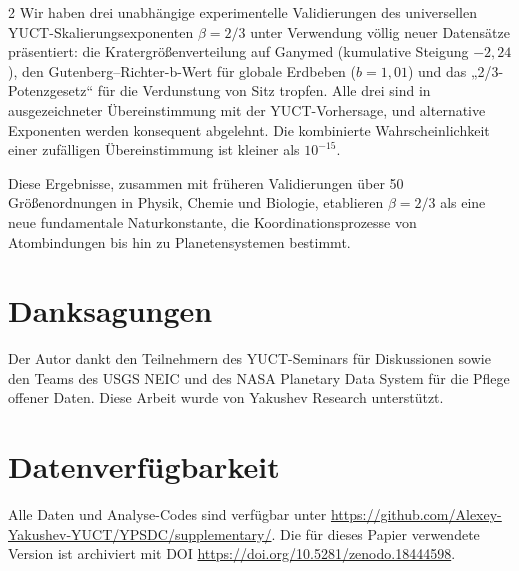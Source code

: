 \documentclass[11pt,a4paper]{article}
\newcommand{\betaf}{\beta}
\begin{document}
\begin{multicols}{2}
		Wir haben drei unabhängige experimentelle Validierungen des universellen YUCT-Skalierungsexponenten \(\betaf = 2/3\) unter Verwendung völlig neuer Datensätze präsentiert: die Kratergrößenverteilung auf Ganymed (kumulative Steigung \(-2,24\)), den Gutenberg–Richter-b-Wert für globale Erdbeben (\(b = 1,01\)) und das „2/3-Potenzgesetz“ für die Verdunstung von Sitz tropfen. Alle drei sind in ausgezeichneter Übereinstimmung mit der YUCT-Vorhersage, und alternative Exponenten werden konsequent abgelehnt. Die kombinierte Wahrscheinlichkeit einer zufälligen Übereinstimmung ist kleiner als \(10^{-15}\).
		
		Diese Ergebnisse, zusammen mit früheren Validierungen über 50 Größenordnungen in Physik, Chemie und Biologie, etablieren \(\betaf = 2/3\) als eine neue fundamentale Naturkonstante, die Koordinationsprozesse von Atombindungen bis hin zu Planetensystemen bestimmt.
		
		\section*{Danksagungen}
		
		Der Autor dankt den Teilnehmern des YUCT-Seminars für Diskussionen sowie den Teams des USGS NEIC und des NASA Planetary Data System für die Pflege offener Daten. Diese Arbeit wurde von Yakushev Research unterstützt.
		
		\section*{Datenverfügbarkeit}
		
		Alle Daten und Analyse-Codes sind verfügbar unter \url{https://github.com/Alexey-Yakushev-YUCT/YPSDC/supplementary/}. Die für dieses Papier verwendete Version ist archiviert mit DOI \url{https://doi.org/10.5281/zenodo.18444598}.
		

\end{multicols}
\end{document}
